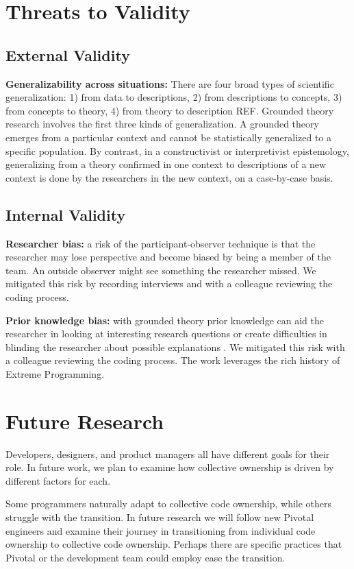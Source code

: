 \begin{table}[]
\section{Threats to Validity}

\subsection{External Validity}

\textbf{Generalizability across situations:} There are four broad types of scientific generalization: 1) from data to descriptions, 2) from descriptions to concepts, 3) from concepts to theory, 4) from theory to description REF. Grounded theory research involves the first three kinds of generalization. A grounded theory emerges from a particular context and cannot be statistically generalized to a specific population. By contrast, in a constructivist or interpretivist epistemology, generalizing from a theory confirmed in one context to descriptions of a new context is done by the researchers in the new context, on a case-by-case basis. 

\subsection{Internal Validity}
\textbf{Researcher bias:} a risk of the participant-observer technique is that the researcher may lose perspective and become biased by being a member of the team. An outside observer might see something the researcher missed. We mitigated this risk by recording interviews and with a colleague reviewing the coding process.

\textbf{Prior knowledge bias:} with grounded theory prior knowledge can aid the researcher in looking at interesting research questions or create difficulties in blinding the researcher about possible explanations \cite{GlaserIssues}. We mitigated this risk with a colleague reviewing the coding process. The work leverages the rich history of Extreme Programming.
\section{Future Research}
Developers, designers, and product managers all have different goals for their role. In future work, we plan to examine how collective ownership is driven by different factors for each.

Some programmers naturally adapt to collective code ownership, while others struggle with the transition. In future research we will follow new Pivotal engineers and examine their journey in transitioning from individual code ownership to collective code ownership. Perhaps there are 
specific practices that Pivotal or the development team could employ ease the transition. 


\end{table}
